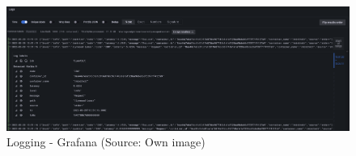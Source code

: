 \begin{figure}[H]
    \centering
    \includegraphics[width = \linewidth]{images/monitoring/logging_1.png}
    \caption{Logging - Grafana (Source: Own image)}
\end{figure}